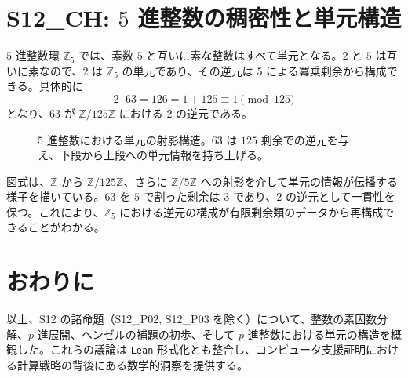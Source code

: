 \documentclass[12pt]{ltjsarticle}
\begin{document}
\section{S12\_CH: $5$ 進整数の稠密性と単元構造}
$5$ 進整数環 $\mathbb{Z}_5$ では、素数 $5$ と互いに素な整数はすべて単元となる。$2$ と $5$ は互いに素なので、$2$ は $\mathbb{Z}_5$ の単元であり、その逆元は $5$ による冪乗剰余から構成できる。具体的に
\[
2 \cdot 63 = 126 = 1 + 125 \equiv 1 \pmod{125}
\]
となり、$63$ が $\mathbb{Z}/125\mathbb{Z}$ における $2$ の逆元である。

\begin{figure}[htbp]
  \centering
  \caption{$5$ 進整数における単元の射影構造。$63$ は $125$ 剰余での逆元を与え、下段から上段への単元情報を持ち上げる。}
\end{figure}

図式は、$\mathbb{Z}$ から $\mathbb{Z}/125\mathbb{Z}$、さらに $\mathbb{Z}/5\mathbb{Z}$ への射影を介して単元の情報が伝播する様子を描いている。$63$ を $5$ で割った剰余は $3$ であり、$2$ の逆元として一貫性を保つ。これにより、$\mathbb{Z}_5$ における逆元の構成が有限剰余類のデータから再構成できることがわかる。

\section{おわりに}
以上、S12 の諸命題（S12\_P02, S12\_P03 を除く）について、整数の素因数分解、$p$ 進展開、ヘンゼルの補題の初歩、そして $p$ 進整数における単元の構造を概観した。これらの議論は \texttt{Lean} 形式化とも整合し、コンピュータ支援証明における計算戦略の背後にある数学的洞察を提供する。
\end{document}
